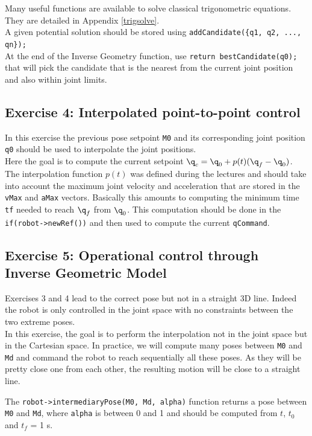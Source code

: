 \documentclass{ecnreport}
\begin{document}
  Many useful functions are available to solve classical trigonometric equations. They are detailed in Appendix \ref{trigsolve}.\\
  
  A given potential solution should be stored using \texttt{addCandidate(\{q1, q2, ..., qn\});}\\ At the end of the Inverse Geometry function, use \texttt{return bestCandidate(q0);} that will pick the candidate that is the nearest from the current joint position and also within joint limits.
  
  \subsection*{Exercise 4: Interpolated point-to-point control}
  
  In this exercise the previous pose setpoint \texttt{M0} and its corresponding joint position \texttt{q0} should be used to interpolate the joint positions.\\
  
  Here the goal is to compute the current setpoint $\q_c = \q_0 + p(t)(\q_f-\q_0)$. The interpolation function $p(t)$ was defined during the lectures and should take into account the maximum joint velocity and acceleration that are stored in the \texttt{vMax} and \texttt{aMax} vectors. Basically this amounts to computing the minimum time \texttt{tf} needed to reach $\q_f$ from $\q_0$. This computation should be done in the \texttt{if(robot->newRef())} and then used to compute the current \texttt{qCommand}.
  
  
  \subsection*{Exercise 5: Operational control through Inverse Geometric Model}
  
  Exercises 3 and 4 lead to the correct pose but not in a straight 3D line. Indeed the robot is only controlled in the joint space with no constraints between the two extreme poses.\\
  In this exercise, the goal is to perform the interpolation not in the joint space but in the Cartesian space. In practice, we will compute many poses between 
  \texttt{M0} and \texttt{Md} and command the robot to reach sequentially all these poses. As they will be pretty close one from each other, the resulting motion 
  will be close to a straight line.
  
  The \texttt{robot->intermediaryPose(M0, Md, alpha)} function returns a pose between \texttt{M0} and \texttt{Md}, where \texttt{alpha} is between 0 and 1 and should be computed from $t$, $t_0$ and $t_f$ = 1 s.
  
\end{document}
